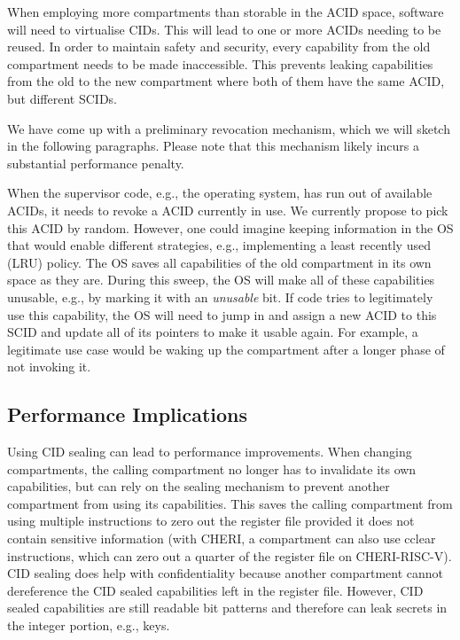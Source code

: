 When employing more compartments than storable in the ACID space, software will need to virtualise CIDs.
This will lead to one or more ACIDs needing to be reused.
In order to maintain safety and security, every capability from the old compartment needs to be made inaccessible.
This prevents leaking capabilities from the old to the new compartment where both of them have the same ACID, but different SCIDs.

We have come up with a preliminary revocation mechanism, which we will sketch in the following paragraphs.
Please note that this mechanism likely incurs a substantial performance penalty.

When the supervisor code, e.g., the operating system, has run out of available ACIDs, it needs to revoke a ACID currently in use.
We currently propose to pick this ACID by random.
However, one could imagine keeping information in the OS that would enable different strategies, e.g., implementing a least recently used (LRU) policy.
The OS saves all capabilities of the old compartment in its own space as they are.
During this sweep, the OS will make all of these capabilities unusable, e.g., by marking it with an \textit{unusable} bit.
If code tries to legitimately use this capability, the OS will need to jump in and assign a new ACID to this SCID and update all of its pointers to make it usable again.
For example, a legitimate use case would be waking up the compartment after a longer phase of not invoking it.

\subsection{Performance Implications}

Using CID sealing can lead to performance improvements.
When changing compartments, the calling compartment no longer has to invalidate its own capabilities, but can rely on the sealing mechanism to prevent another compartment from using its capabilities.
This saves the calling compartment from using multiple instructions to zero out the register file provided it does not contain sensitive information (with CHERI, a compartment can also use cclear instructions, which can zero out a quarter of the register file on CHERI-RISC-V).
CID sealing does help with confidentiality because another compartment cannot dereference the CID sealed capabilities left in the register file.
However, CID sealed capabilities are still readable bit patterns and therefore can leak secrets in the integer portion, e.g., keys.

